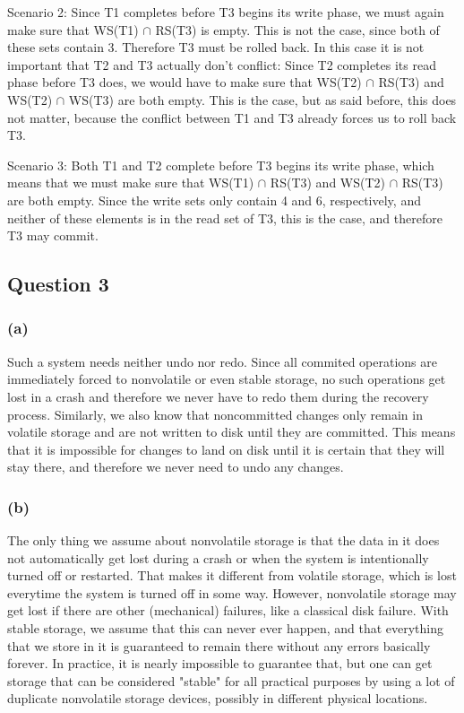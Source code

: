 \documentclass[12pt,a4paper]{article}
\begin{document}
Scenario 2:
Since T1 completes before T3 begins its write phase, we must again make sure that WS(T1) $\cap$ RS(T3) is empty. This is not the case, since both of these sets contain 3. Therefore T3 must be rolled back. In this case it is not important that T2 and T3 actually don't conflict: Since T2 completes its read phase before T3 does, we would have to make sure that WS(T2) $\cap$ RS(T3) and WS(T2) $\cap$ WS(T3) are both empty. This is the case, but as said before, this does not matter, because the conflict between T1 and T3 already forces us to roll back T3.
 
Scenario 3: 
Both T1 and T2 complete before T3 begins its write phase, which means that we must make sure that WS(T1) $\cap$ RS(T3) and WS(T2) $\cap$ RS(T3) are both empty. Since the write sets only contain 4 and 6, respectively, and neither of these elements is in the read set of T3, this is the case, and therefore T3 may commit.


\subsection*{Question 3}
\label{sec:eq3}

\subsubsection*{(a)}
Such a system needs neither undo nor redo. Since all commited operations are immediately forced to nonvolatile or even stable storage, no such operations get lost in a crash and therefore we never have to redo them during the recovery process. Similarly, we also know that noncommitted changes only remain in volatile storage and are not written to disk until they are committed. This means that it is impossible for changes to land on disk until it is certain that they will stay there, and therefore we never need to undo any changes.

\subsubsection*{(b)}
The only thing we assume about nonvolatile storage is that the data in it does not automatically get lost during a crash or when the system is intentionally turned off or restarted. That makes it different from volatile storage, which is lost everytime the system is turned off in some way. However, nonvolatile storage may get lost if there are other (mechanical) failures, like a classical disk failure. With stable storage, we assume that this can never ever happen, and that everything that we store in it is guaranteed to remain there without any errors basically forever. In practice, it is nearly impossible to guarantee that, but one can get storage that can be considered "stable" for all practical purposes by using a lot of duplicate nonvolatile storage devices, possibly in different physical locations.
\end{document}
